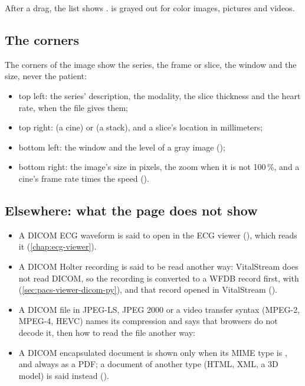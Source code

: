 After a drag, the list shows .  is grayed out for color images, pictures
and videos.

\subsection{The corners}
\label{sec:pacs-viewer-corners}

The corners of the image show the series, the frame or slice, the window and the size, never the
patient:
\begin{itemize}
\item top left: the series' description, the modality, the slice thickness and the heart rate,
  when the file gives them;
\item top right:  (a cine) or  (a stack), and a slice's
  location in millimeters;
\item bottom left: the window and the level of a gray image ();
\item bottom right: the image's size in pixels, the zoom when it is not 100\,\%, and a cine's
  frame rate times the speed ().
\end{itemize}

\subsection{Elsewhere: what the page does not show}
\label{sec:pacs-viewer-elsewhere}

\begin{itemize}
\item A DICOM ECG waveform is said to open in the ECG viewer (), which reads it (\cref{chap:ecg-viewer}).
\item A DICOM Holter recording is said to be read another way: VitalStream does not read DICOM, so
  the recording is converted to a WFDB record first, with 
  (\cref{sec:pacs-viewer-dicom-py}), and that record opened in VitalStream ().
\item A DICOM file in JPEG-LS, JPEG 2000 or a video transfer syntax (MPEG-2, MPEG-4, HEVC) names
  its compression and says that browsers do not decode it, then how to read the file another way:
\item A DICOM encapsulated document is shown only when its MIME type is ,
  and always as a PDF; a document of another type (HTML, XML, a 3D model) is said instead
  ().
\end{itemize}

